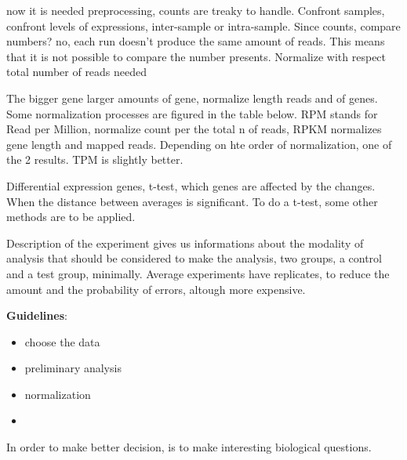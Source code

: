 now it is needed preprocessing, counts are treaky to handle. Confront samples, confront levels of expressions, inter-sample or intra-sample. Since counts, compare numbers? no, each run doesn't produce the same amount of reads. This means that it is not possible to compare the number presents. Normalize with respect total number of reads needed 

The bigger gene larger amounts of gene, normalize length reads and of genes. Some normalization processes are figured in the table below. RPM stands for Read per Million, normalize count per the total n of reads, RPKM normalizes gene length and mapped reads. Depending on hte order of normalization, one of the 2 results. TPM is slightly better.


Differential expression genes, t-test, which genes are affected by the changes. When the distance between averages is significant. To do a t-test, some other methods are to be applied. 


Description of the experiment gives us informations about the modality of analysis that should be considered to make the analysis, two groups, a control and a test group, minimally. 
Average experiments have replicates, to reduce the amount and the probability of errors, altough more expensive. 

\textbf{Guidelines}:
\begin{itemize}
	\item choose the data
	\item preliminary analysis
	\item normalization
	\item
\end{itemize} 

In order to make better decision, is to make interesting biological questions. 
%













